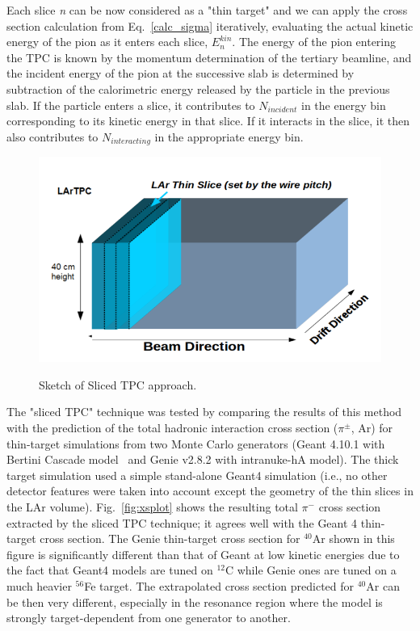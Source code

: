Each slice {\emph{n}} can be now considered as a "thin target" and we can apply the cross section calculation from Eq.~\ref{calc_sigma} iteratively, evaluating the actual kinetic energy of the pion as it enters each slice, $E_{n}^{kin}$. The energy of the pion entering the TPC is known by the momentum determination of the tertiary beamline, and the incident energy of the pion at the successive slab is determined by subtraction of the calorimetric energy released by the particle in the previous slab. If the particle enters a slice, it contributes to $N_{incident}$ in the energy bin corresponding to its kinetic energy in that slice. If it interacts in the slice, it then also contributes to $N_{interacting}$ in the appropriate energy bin.

\begin{figure}[ht!]
\centering
\includegraphics[scale=0.35]{./images/SlicedTPC.png}\\
\caption{Sketch of Sliced TPC approach.}
\label{fig:slicedtpc}
\end{figure}

The "sliced TPC" technique was tested by comparing the results of this method with the prediction of the total hadronic interaction cross section ($\pi^{\pm}$, Ar) for thin-target simulations from two Monte Carlo generators (Geant 4.10.1 with Bertini Cascade model~\cite{geant4, g4bert} and Genie v2.8.2 with intranuke-hA model). The thick target simulation used a simple stand-alone Geant4 simulation  (i.e., no other detector features were taken into account except the geometry of the thin slices in the LAr volume). Fig.~\ref{fig:xsplot} shows the resulting total ${\pi^-}$ cross section extracted by the sliced TPC technique; it agrees well with the Geant 4 thin-target cross section. The Genie thin-target cross section for $^{40}$Ar shown in this figure is significantly different than that of Geant at low kinetic energies due to the fact that Geant4 models are tuned on $^{12}$C while Genie ones are tuned on a much heavier $^{56}$Fe target. The extrapolated cross section predicted for $^{40}$Ar can be then very different, especially in the resonance region where the model is strongly target-dependent from one generator to another.
 

